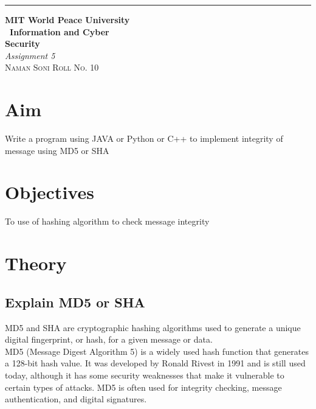 \documentclass{article}
\begin{document}
	\begin{titlepage} %
	
	\raggedleft\rule{1pt}{\textheight} %
	\hspace{0.05\textwidth} %
	\parbox[b]{0.75\textwidth}
	{ %
		
		{\Huge\bfseries MIT World Peace University \\[0.5\baselineskip] \ Information and Cyber \\ Security}\\[2\baselineskip] %
		{\large\textit{Assignment 5}}\\[4\baselineskip] %
		{\Large\textsc{Naman Soni Roll No. 10}} %
		
		\vspace{0.5\textheight} %
	}
	
\end{titlepage}
\tableofcontents
\pagebreak
\section{\textbf{Aim}}
Write a program using JAVA or Python or C++ to implement integrity of message using MD5 or SHA
\section{\textbf{Objectives}}
To use of hashing algorithm to check message integrity
\section{\textbf{Theory}}
\subsection{\textbf{Explain MD5 or SHA}}
MD5 and SHA are cryptographic hashing algorithms used to generate a unique digital fingerprint, or hash, for a given message or data.\\

MD5 (Message Digest Algorithm 5) is a widely used hash function that generates a 128-bit hash value. It was developed by Ronald Rivest in 1991 and is still used today, although it has some security weaknesses that make it vulnerable to certain types of attacks. MD5 is often used for integrity checking, message authentication, and digital signatures.\\
\end{document}
